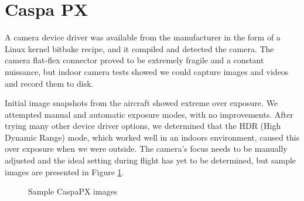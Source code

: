 \documentclass[a4paper,11pt]{report}
\begin{document}
\section{Caspa PX}

A camera device driver was available from the manufacturer in the form of a Linux kernel bitbake recipe, and it compiled and detected the camera. The camera flat-flex connector proved to be extremely fragile and a constant nuissance, but indoor camera tests showed we could capture images and videos and record them to disk. 

Initial image snapshots from the aircraft showed extreme over exposure. We attempted manual and automatic exposure modes, with no improvements. After trying many other device driver options, we determined that the HDR (High Dynamic Range) mode, which worked well in an indoors environment, caused this over exposure when we were outside. The camera's focus needs to be manually adjusted and the ideal setting during flight has yet to be determined, but sample images are presented in Figure \ref{fig:caspa_sample}.

\begin{figure}[ht]
  \centering
  \caption{Sample CaspaPX images}
  \label{fig:caspa_sample}
\end{figure} 
\end{document}
